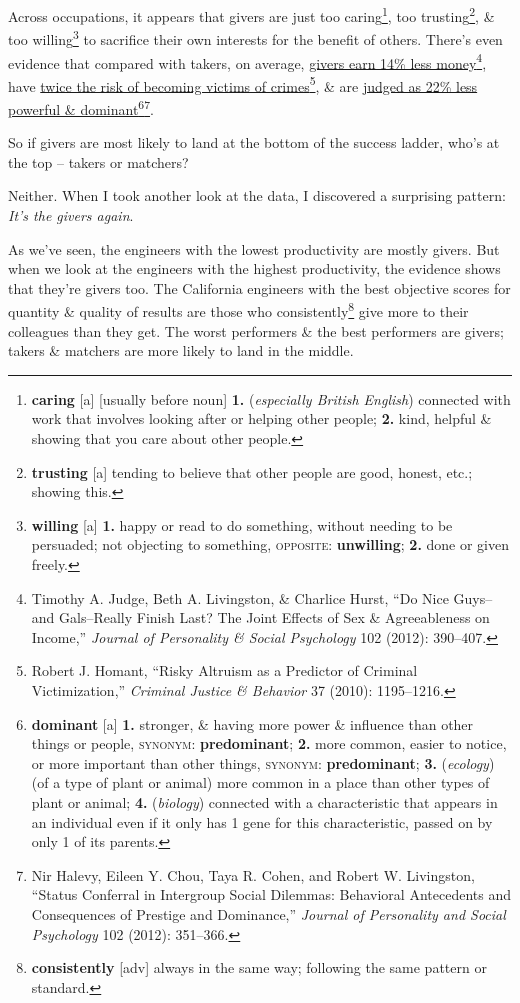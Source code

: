 \documentclass[oneside]{book}
\numberwithin{equation}{section}
\begin{document}
Across occupations, it appears that givers are just too caring\footnote{\textbf{caring} [a] [usually before noun] \textbf{1.} (\textit{especially British English}) connected with work that involves looking after or helping other people; \textbf{2.} kind, helpful \& showing that you care about other people.}, too trusting\footnote{\textbf{trusting} [a] tending to believe that other people are good, honest, etc.; showing this.}, \& too willing\footnote{\textbf{willing} [a] \textbf{1.} happy or read to do something, without needing to be persuaded; not objecting to something, \textsc{opposite}: \textbf{unwilling}; \textbf{2.} done or given freely.} to sacrifice their own interests for the benefit of others. There's even evidence that compared with takers, on average, \underline{givers earn 14\% less money}\footnote{Timothy A. Judge, Beth A. Livingston, \& Charlice Hurst, ``Do Nice Guys--and Gals--Really Finish Last? The Joint Effects of Sex \& Agreeableness on Income,” \textit{Journal of Personality \& Social Psychology} 102 (2012): 390--407.}, have \underline{twice the risk of becoming victims of crimes}\footnote{Robert J. Homant, ``Risky Altruism as a Predictor of Criminal Victimization,'' \textit{Criminal Justice \& Behavior} 37 (2010): 1195--1216.}, \& are \underline{judged as 22\% less powerful \& dominant\footnote{\textbf{dominant} [a] \textbf{1.} stronger, \& having more power \& influence than other things or people, \textsc{synonym}: \textbf{predominant}; \textbf{2.} more common, easier to notice, or more important than other things, \textsc{synonym}: \textbf{predominant}; \textbf{3.} (\textit{ecology}) (of a type of plant or animal) more common in a place than other types of plant or animal; \textbf{4.} (\textit{biology}) connected with a characteristic that appears in an individual even if it only has 1 gene for this characteristic, passed on by only 1 of its parents.}}\footnote{Nir Halevy, Eileen Y. Chou, Taya R. Cohen, and Robert W. Livingston, ``Status Conferral in Intergroup Social Dilemmas: Behavioral Antecedents and Consequences of Prestige and Dominance,'' \textit{Journal of Personality and Social Psychology} 102 (2012): 351--366.}.

So if givers are most likely to land at the bottom of the success ladder, who's at the top -- takers or matchers?

Neither. When I took another look at the data, I discovered a surprising pattern: \textit{It's the givers again}.

As we've seen, the engineers with the lowest productivity are mostly givers. But when we look at the engineers with the highest productivity, the evidence shows that they're givers too. The California engineers with the best objective scores for quantity \& quality of results are those who consistently\footnote{\textbf{consistently} [adv] always in the same way; following the same pattern or standard.} give more to their colleagues than they get. The worst performers \& the best performers are givers; takers \& matchers are more likely to land in the middle.
\end{document}

